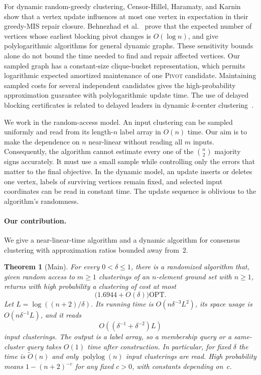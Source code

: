 \documentclass[11pt,letterpaper]{article}
\newtheorem{theorem}{Theorem}[section]
\theoremstyle{definition}
\theoremstyle{remark}
\newcommand{\OPT}{\mathrm{OPT}}
\newcommand{\1}{\mathbf{1}}
\newcommand{\polylog}{\operatorname{polylog}}
\newcommand{\Pivot}{\textnormal{\textsc{Pivot}}}
\begin{document}
For dynamic random-greedy clustering, Censor-Hillel, Haramaty, and Karnin~\cite{censor-hillel-2016} show that a vertex update influences at most one vertex in expectation in their greedy-MIS repair closure.  Behnezhad et al.~\cite{behnezhad-2019} prove that the expected number of vertices whose earliest blocking pivot changes is $O(\log n)$, and give polylogarithmic algorithms for general dynamic graphs.  These sensitivity bounds alone do not bound the time needed to find and repair affected vertices.  Our sampled graph has a constant-size clique-bucket representation, which permits logarithmic expected amortized maintenance of one \Pivot{} candidate.  Maintaining sampled costs for several independent candidates gives the high-probability approximation guarantee with polylogarithmic update time.  The use of delayed blocking certificates is related to delayed leaders in dynamic $k$-center clustering~\cite{bateni-2023}.

We work in the random-access model.  An input clustering can be sampled uniformly and read from its length-$n$ label array in $O(n)$ time.  Our aim is to make the dependence on $n$ near-linear without reading all $m$ inputs.  Consequently, the algorithm cannot estimate every one of the $\binom n2$ majority signs accurately.  It must use a small sample while controlling only the errors that matter to the final objective.  In the dynamic model, an update inserts or deletes one vertex, labels of surviving vertices remain fixed, and selected input coordinates can be read in constant time.  The update sequence is oblivious to the algorithm's randomness.

\paragraph{Our contribution.}
We give a near-linear-time algorithm and a dynamic algorithm for consensus clustering with approximation ratios bounded away from~$2$.

\begin{theorem}[Main]\label{thm:main}
For every $0<\delta\le1$, there is a randomized algorithm that, given random access to $m\ge1$ clusterings of an $n$-element ground set with $n\ge1$, returns with high probability a clustering of cost at most
\[
 \bigl(1.6944+O(\delta)\bigr)\OPT.
\]
Let $L=\log((n+2)/\delta)$.  Its running time is $O(n\delta^{-3}L^2)$, its space usage is $O(n\delta^{-1}L)$, and it reads
\[
 O\!\left((\delta^{-1}+\delta^{-2})L\right)
\]
input clusterings.  The output is a label array, so a membership query or a same-cluster query takes $O(1)$ time after construction.  In particular, for fixed $\delta$ the time is $\widetilde O(n)$ and only $\polylog(n)$ input clusterings are read.  High probability means $1-(n+2)^{-c}$ for any fixed $c>0$, with constants depending on~$c$.
\end{theorem}
\end{document}
